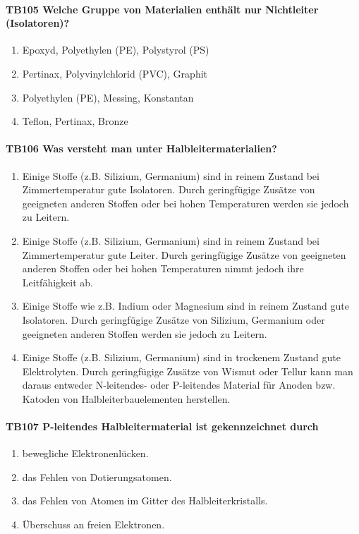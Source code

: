 \documentclass[8pt]{article}
\begin{document}
\begin{enumerate}
\paragraph*{TB105 Welche Gruppe von Materialien enthält nur Nichtleiter (Isolatoren)?}
\begin{enumerate}[nolistsep,label=\Alph*]
\item Epoxyd, Polyethylen (PE), Polystyrol (PS)
\item Pertinax, Polyvinylchlorid (PVC), Graphit
\item Polyethylen (PE), Messing, Konstantan
\item Teflon, Pertinax, Bronze
\end{enumerate}



\paragraph*{TB106 Was versteht man unter Halbleitermaterialien?}
\begin{enumerate}[nolistsep,label=\Alph*]
\item Einige Stoffe (z.B. Silizium, Germanium) sind in reinem Zustand bei Zimmertemperatur gute Isolatoren. Durch geringfügige Zusätze von geeigneten anderen Stoffen oder bei hohen Temperaturen werden sie jedoch zu Leitern.
\item Einige Stoffe (z.B. Silizium, Germanium) sind in reinem Zustand bei Zimmertemperatur gute Leiter. Durch geringfügige Zusätze von geeigneten anderen Stoffen oder bei hohen Temperaturen nimmt jedoch ihre Leitfähigkeit ab.
\item Einige Stoffe wie z.B. Indium oder Magnesium sind in reinem Zustand gute Isolatoren. Durch geringfügige Zusätze von Silizium, Germanium oder geeigneten anderen Stoffen werden sie jedoch zu Leitern.
\item Einige Stoffe (z.B. Silizium, Germanium) sind in trockenem Zustand gute Elektrolyten. Durch geringfügige Zusätze von Wismut oder Tellur kann man daraus entweder N-leitendes- oder P-leitendes Material für Anoden bzw. Katoden von Halbleiterbauelementen herstellen.
\end{enumerate}



\paragraph*{TB107 P-leitendes Halbleitermaterial ist gekennzeichnet durch}
\begin{enumerate}[nolistsep,label=\Alph*]
\item bewegliche Elektronenlücken.
\item das Fehlen von Dotierungsatomen.
\item das Fehlen von Atomen im Gitter des Halbleiterkristalls.
\item Überschuss an freien Elektronen.
\end{enumerate}




\end{enumerate}
\end{document}
